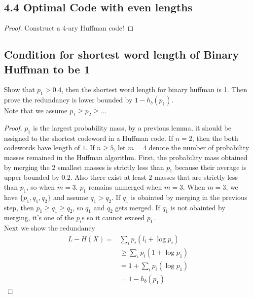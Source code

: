 \documentclass[../main.tex]{subfiles}
\begin{document}
 \subsection*{4.4 Optimal Code with even lengths}
 \begin{proof}Construct a 4-ary Huffman code!
 \end{proof}
 \subsection*{Condition for shortest word length of Binary Huffman to be 1}
 Show that $p_1>0.4$, then the shortest word length for binary huffman is 1. Then prove the redundancy is lower bounded by $1-h_b(p_1)$.\\
 Note that we assume $p_1\geq p_2\geq\dots$
 \begin{proof}
     $p_1$ is the largest probability mass, by a previous lemma, it should be assigned to the shortest codeword in a Huffman code. If $n=2$, then the both codewords have length of $1$. If $n\geq 5$, let $m = 4$ denote the number of probability masses remained in the Huffman algorithm. First, the probability mass obtained by merging the 2 smallest masses is strictly less than $p_1$ because their average is upper bounded by $0.2$. Also there exist at least 2 masses that are strictly less than $p_1$, so when $m=3$. $p_1$ remains unmerged when $m=3$. When $m=3$, we have $\{p_1, q_1,q_2\}$ and assume $q_1>q_2$. If $q_1$ is  obainted by merging in the previous step, then $p_1\geq q_1\geq q_2$, so $q_1$ and $q_2$ gets merged. If $q_1$ is not obainted by merging, it's one of the $p_i$s so it cannot exceed $p_1$.\\

     Next we show the redundancy \begin{align*}
         L-H(X) =& \sum_{i}p_i (l_i + \log p_i)\\
         &\geq \sum_{i}p_i(1+\log p_1)\\
         &= 1+\sum_{i}p_i(\log p_1)\\
         &= 1 - h_b(p_1)
     \end{align*}
 \end{proof}
\end{document}
